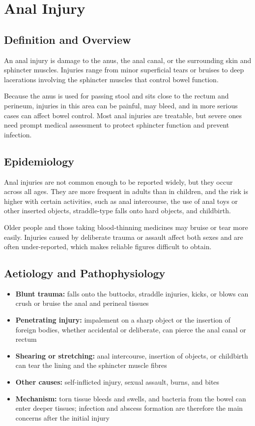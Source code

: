 \chapter{Anal Injury}

\section*{Definition and Overview}
An anal injury is damage to the anus, the anal canal, or the surrounding skin and sphincter muscles. Injuries range from minor superficial tears or bruises to deep lacerations involving the sphincter muscles that control bowel function.

Because the anus is used for passing stool and sits close to the rectum and perineum, injuries in this area can be painful, may bleed, and in more serious cases can affect bowel control. Most anal injuries are treatable, but severe ones need prompt medical assessment to protect sphincter function and prevent infection.

\section*{Epidemiology}
Anal injuries are not common enough to be reported widely, but they occur across all ages. They are more frequent in adults than in children, and the risk is higher with certain activities, such as anal intercourse, the use of anal toys or other inserted objects, straddle-type falls onto hard objects, and childbirth.

Older people and those taking blood-thinning medicines may bruise or tear more easily. Injuries caused by deliberate trauma or assault affect both sexes and are often under-reported, which makes reliable figures difficult to obtain.

\section*{Aetiology and Pathophysiology}
\begin{itemize}
    \item \textbf{Blunt trauma:} falls onto the buttocks, straddle injuries, kicks, or blows can crush or bruise the anal and perineal tissues
    \item \textbf{Penetrating injury:} impalement on a sharp object or the insertion of foreign bodies, whether accidental or deliberate, can pierce the anal canal or rectum
    \item \textbf{Shearing or stretching:} anal intercourse, insertion of objects, or childbirth can tear the lining and the sphincter muscle fibres
    \item \textbf{Other causes:} self-inflicted injury, sexual assault, burns, and bites
    \item \textbf{Mechanism:} torn tissue bleeds and swells, and bacteria from the bowel can enter deeper tissues; infection and abscess formation are therefore the main concerns after the initial injury
\end{itemize}

